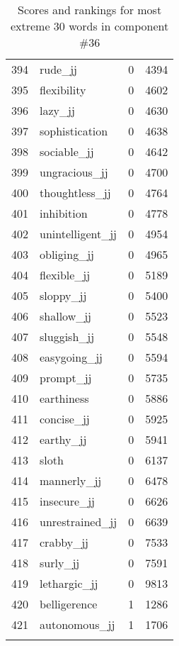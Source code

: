 \begin{longtable}[!htbp]{| rlr@{.}l |}
    394 & rude\_jj & 0 & 4394 \\
    395 & flexibility & 0 & 4602 \\
    396 & lazy\_jj & 0 & 4630 \\
    397 & sophistication & 0 & 4638 \\
    398 & sociable\_jj & 0 & 4642 \\
    399 & ungracious\_jj & 0 & 4700 \\
    400 & thoughtless\_jj & 0 & 4764 \\
    401 & inhibition & 0 & 4778 \\
    402 & unintelligent\_jj & 0 & 4954 \\
    403 & obliging\_jj & 0 & 4965 \\
    404 & flexible\_jj & 0 & 5189 \\
    405 & sloppy\_jj & 0 & 5400 \\
    406 & shallow\_jj & 0 & 5523 \\
    407 & sluggish\_jj & 0 & 5548 \\
    408 & easygoing\_jj & 0 & 5594 \\
    409 & prompt\_jj & 0 & 5735 \\
    410 & earthiness & 0 & 5886 \\
    411 & concise\_jj & 0 & 5925 \\
    412 & earthy\_jj & 0 & 5941 \\
    413 & sloth & 0 & 6137 \\
    414 & mannerly\_jj & 0 & 6478 \\
    415 & insecure\_jj & 0 & 6626 \\
    416 & unrestrained\_jj & 0 & 6639 \\
    417 & crabby\_jj & 0 & 7533 \\
    418 & surly\_jj & 0 & 7591 \\
    419 & lethargic\_jj & 0 & 9813 \\
    420 & belligerence & 1 & 1286 \\
    421 & autonomous\_jj & 1 & 1706 \\
    \hline
    \caption{Scores and rankings for most extreme 30 words in component \#36} \\
\end{longtable}
